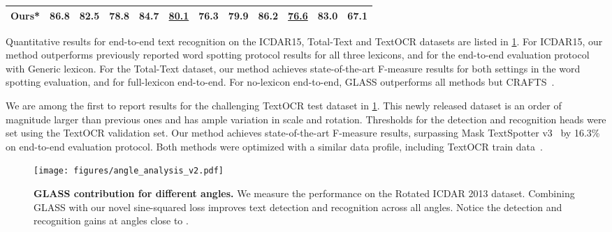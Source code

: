 \documentclass[runningheads]{llncs}
\begin{document}
\begin{table}[t]
{\begin{tabular}{lccccccccccc}
\multicolumn{1}{l}{\textbf{Ours}*} 
&   \textbf{86.8}
&      \textbf{ 82.5 }
&    \textbf{78.8}
&    {84.7}
&     \underline{80.1}
&    \textbf{76.3} 
         & \textbf{79.9} & \textbf{86.2} &  \underline{76.6}
&   \textbf{83.0} & \textbf{67.1}
 \\
\bottomrule
\end{tabular}}
\label{tab:res_icdar_totaltext}
\end{table}

















%
 

Quantitative results for end-to-end text recognition on the ICDAR15, Total-Text and TextOCR datasets are listed in \cref{tab:res_icdar_totaltext}.
For ICDAR15, our method outperforms previously reported word spotting protocol results for all three lexicons, and for the end-to-end evaluation protocol with Generic lexicon. 
For the Total-Text dataset, our method achieves state-of-the-art F-measure results for both settings in the word spotting evaluation, and for full-lexicon end-to-end.
For no-lexicon end-to-end, GLASS outperforms all methods but CRAFTS~\cite{baek2020crafts}.

We are among the first to report results for the challenging TextOCR test dataset in \cref{tab:res_icdar_totaltext}. This newly released dataset is an order of magnitude larger than previous ones and has ample variation in scale and rotation.
Thresholds for the detection and recognition heads were set using the TextOCR validation set.  
Our method achieves state-of-the-art F-measure results, surpassing Mask TextSpotter v3~\cite{liao2020spotterV3} by 16.3\% on end-to-end evaluation protocol.
Both methods were optimized with a similar data profile, including TextOCR train data~\cite{singh2021textocr}.

\begin{figure}[t]
 \centering
  \texttt{[image: figures/angle\_analysis\_v2.pdf]}
\caption{\textbf{GLASS contribution for different angles.}
   We measure the performance on the Rotated ICDAR 2013 dataset.
   Combining GLASS with our novel sine-squared loss improves text detection and recognition across all angles.
   Notice the  detection and  recognition gains at angles close to . 
   }
  \label{fig:angle_analysis}
\end{figure}
\end{document}
